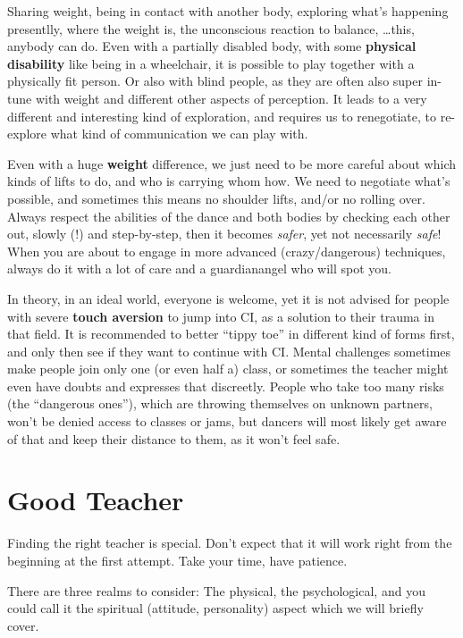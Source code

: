 Sharing weight, being in contact with another body, exploring what's happening presentlly, where the weight is, the unconscious reaction to balance, \ldots this, anybody can do.
Even with a partially disabled body, with some \textbf{physical disability} like being in a wheelchair, it is possible to play together with a physically fit person.
Or also with blind people, as they are often also super in-tune with weight and different other aspects of perception.
It leads to a very different and interesting kind of exploration, and requires us to renegotiate, to re-explore what kind of communication we can play with.

Even with a huge \textbf{weight} difference, we just need to be more careful about which kinds of lifts to do, and who is carrying whom how.
We need to negotiate what's possible, and sometimes this means no shoulder lifts, and/or no rolling over.
Always respect the abilities of the dance and both bodies by checking each other out, slowly (!) and step-by-step, then it becomes \textit{safer}, yet not necessarily \textit{safe}!
When you are about to engage in more advanced (crazy/dangerous) techniques, always do it with a lot of care and a \gls{guardianangel} who will spot you.

In theory, in an ideal world, everyone is welcome, yet it is not advised for people with severe \textbf{touch aversion} to jump into CI, as a solution to their trauma in that field.
It is recommended to better ``tippy toe'' in different kind of forms first, and only then see if they want to continue with CI\@.
Mental challenges sometimes make people join only one (or even half a) class, or sometimes the teacher might even have doubts and expresses that discreetly.
People who take too many risks (the ``dangerous ones''), which are throwing themselves on unknown partners, won't be denied access to classes or jams, but dancers will most likely get aware of that and keep their distance to them, as it won't feel safe.

\section{Good Teacher}\label{sec:good-teacher}

Finding the right teacher is special.
Don’t expect that it will work right from the beginning at the first attempt.
Take your time, have patience.

There are three realms to consider: The physical, the psychological, and you could call it the spiritual (attitude, personality) aspect which we will briefly cover.

